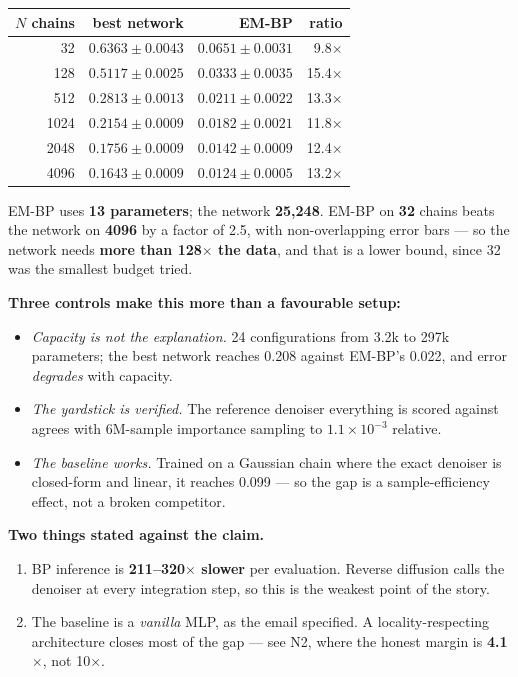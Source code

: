 \documentclass[11pt,a4paper]{article}
\begin{document}
\begin{center}
\begin{tabular}{@{}rrrr@{}}
\toprule
$N$ chains & best network & \textbf{EM-BP} & ratio \\
\midrule
32   & $0.6363 \pm 0.0043$ & $\mathbf{0.0651 \pm 0.0031}$ & 9.8$\times$ \\
128  & $0.5117 \pm 0.0025$ & $\mathbf{0.0333 \pm 0.0035}$ & 15.4$\times$ \\
512  & $0.2813 \pm 0.0013$ & $\mathbf{0.0211 \pm 0.0022}$ & 13.3$\times$ \\
1024 & $0.2154 \pm 0.0009$ & $\mathbf{0.0182 \pm 0.0021}$ & 11.8$\times$ \\
2048 & $0.1756 \pm 0.0009$ & $\mathbf{0.0142 \pm 0.0009}$ & 12.4$\times$ \\
4096 & $0.1643 \pm 0.0009$ & $\mathbf{0.0124 \pm 0.0005}$ & 13.2$\times$ \\
\bottomrule
\end{tabular}
\end{center}

\noindent
EM-BP uses \textbf{13 parameters}; the network \textbf{25{,}248}. EM-BP on \textbf{32}
chains beats the network on \textbf{4096} by a factor of 2.5, with non-overlapping error
bars --- so the network needs \textbf{more than 128$\times$ the data}, and that is a lower
bound, since 32 was the smallest budget tried.

\medskip
\textbf{Three controls make this more than a favourable setup:}
\begin{itemize}
\item \emph{Capacity is not the explanation.} 24 configurations from 3.2k to 297k
parameters; the best network reaches 0.208 against EM-BP's 0.022, and error \emph{degrades}
with capacity.
\item \emph{The yardstick is verified.} The reference denoiser everything is scored against
agrees with 6M-sample importance sampling to $1.1\times 10^{-3}$ relative.
\item \emph{The baseline works.} Trained on a Gaussian chain where the exact denoiser is
closed-form and linear, it reaches 0.099 --- so the gap is a sample-efficiency effect, not a
broken competitor.
\end{itemize}

\begin{keybox}
\textbf{Two things stated against the claim.}
\begin{enumerate}
\item BP inference is \textbf{211--320$\times$ slower} per evaluation. Reverse diffusion
calls the denoiser at every integration step, so this is the weakest point of the story.
\item The baseline is a \emph{vanilla} MLP, as the email specified. A locality-respecting
architecture closes most of the gap --- see N2, where the honest margin is
\textbf{4.1$\times$}, not 10$\times$.
\end{enumerate}
\end{keybox}
\end{document}
